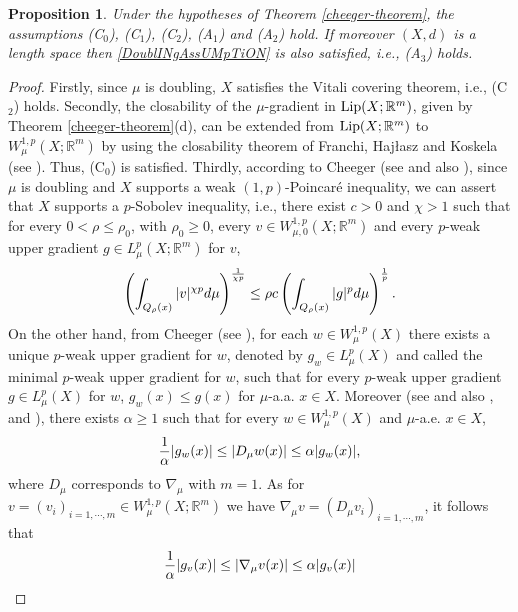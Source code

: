 \documentclass[10pt]{amsart}
\numberwithin{equation}{section}
\newtheorem{proposition}[theorem]{Proposition}
\theoremstyle{definition}
\theoremstyle{remark}
\begin{document}
\begin{proposition}\label{Prop-Cheeger}
Under the hypotheses of Theorem {\rm\ref{cheeger-theorem}}, the assumptions {\rm(C$_0$)}, {\rm(C$_1$)}, {\rm(C$_2$)}, {\rm(A$_1$)} and {\rm(A$_2$)} hold. If moreover $(X,d)$ is a length space then \eqref{DoublINgAssUMpTiON} is also satisfied, i.e., {\rm (A$_3$)} holds. 
\end{proposition}
\begin{proof}
Firstly, since $\mu$ is doubling, $X$ satisfies the Vitali covering theorem, i.e., (C$_2$) holds. Secondly, the closability of the $\mu$-gradient in ${\rm Lip}(X;{{\mathbb R}}^m)$, given by Theorem \ref{cheeger-theorem}(d), can be extended from ${\rm Lip}(X;{{\mathbb R}}^m)$ to $W^{1,p}_\mu(X;{{\mathbb R}}^m)$ by using the closability theorem of Franchi, Haj{\l}asz and Koskela (see \cite[Theorem 10]{fran-haj-kos99}). Thus, (C$_0$) is satisfied. Thirdly,  according to Cheeger (see \cite[\S 4, p. 450]{cheeger99} and also \cite{Haj-Kos-95,hajlaszkoskela00}), since $\mu$ is doubling and $X$ supports a weak $(1,p)$-Poincar\'e inequality, we can assert that $X$ supports a $p$-Sobolev inequality, i.e., there exist $c>0$ and $\chi>1$ such that for every $0<\rho\leq\rho_0$, with $\rho_0\geq 0$, every $v\in W^{1,p}_{\mu,0}(X;{{\mathbb R}}^m)$ and every $p$-weak upper gradient $g\in L^p_\mu(X;{{\mathbb R}}^m)$ for $v$,
\begin{equation}\label{Cheeger-Coro-Eq1}
\left(\int_{Q_\rho(x)}|v|^{\chi p}d\mu\right)^{1\over\chi p}\leq \rho c\left(\int_{Q_\rho(x)}|g|^pd\mu\right)^{1\over p}.
\end{equation}
On the other hand, from Cheeger (see \cite[Theorems 2.10 and 2.18]{cheeger99}), for each $w\in W^{1,p}_\mu(X)$ there exists a unique $p$-weak upper gradient for $w$, denoted by $g_w\in L ^p_\mu(X)$ and called the minimal $p$-weak upper gradient for $w$, such that for every  $p$-weak upper gradient $g\in L^p_\mu(X)$ for $w$, $g_w(x)\leq g(x)$ for $\mu$-a.a.  $x\in X$. Moreover (see \cite[\S 4]{cheeger99} and also \cite[\S B.2, p. 363]{bjorn-bjorn-11}, \cite{bjorn00} and \cite[Remark 2.15]{gong-haj-13}), there exists $\alpha\geq 1$ such that for every $w\in W^{1,p}_\mu(X)$ and $\mu$-a.e. $x\in X$, 
$$
{1\over\alpha} |g_w(x)|\leq|D_\mu w(x)|\leq\alpha|g_w(x)|,
$$ 
where $D_\mu$ corresponds to $\nabla_\mu$ with $m=1$. As for $v=(v_i)_{i=1,\cdots,m}\in W^{1,p}_\mu(X;{{\mathbb R}}^m)$ we have $\nabla_\mu v=(D_\mu v_i)_{i=1,\cdots,m}$, it follows that 
\begin{equation}\label{Cheeger-Coro-Eq2}
{1\over \alpha} |g_v(x)|\leq|\nabla_\mu v(x)|\leq\alpha|g_v(x)|

\end{equation}
\end{proof}
\end{document}

